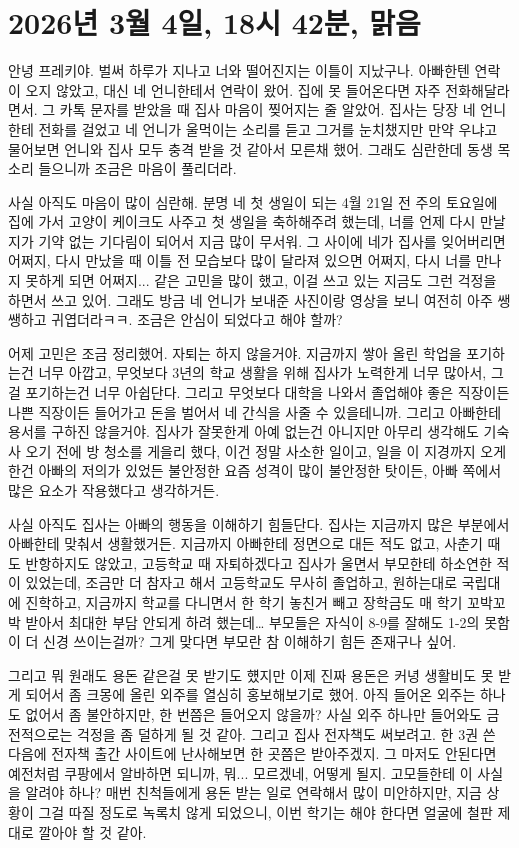 \section{2026년 3월 4일, 18시 42분, 맑음}
안녕 프레키야. 벌써 하루가 지나고 너와 떨어진지는 이틀이 지났구나. 아빠한텐 연락이 오지 않았고, 대신 네 언니한테서 연락이 왔어. 
집에 못 들어온다면 자주 전화해달라면서. 그 카톡 문자를 받았을 때 집사 마음이 찢어지는 줄 알았어. 
집사는 당장 네 언니한테 전화를 걸었고 네 언니가 울먹이는 소리를 듣고 그거를 눈치챘지만 만약 우냐고 물어보면 언니와 집사 모두 충격 받을 것 같아서 모른채 했어. 
그래도 심란한데 동생 목소리 들으니까 조금은 마음이 풀리더라.

사실 아직도 마음이 많이 심란해. 분명 네 첫 생일이 되는 4월 21일 전 주의 토요일에 집에 가서 고양이 케이크도 사주고 첫 생일을 축하해주려 했는데, 
너를 언제 다시 만날지가 기약 없는 기다림이 되어서 지금 많이 무서워. 그 사이에 네가 집사를 잊어버리면 어쩌지, 다시 만났을 때 이틀 전 모습보다 많이 달라져 있으면 어쩌지,
다시 너를 만나지 못하게 되면 어쩌지... 같은 고민을 많이 했고, 이걸 쓰고 있는 지금도 그런 걱정을 하면서 쓰고 있어. 그래도 방금 네 언니가 보내준 사진이랑 영상을 보니 
여전히 아주 쌩쌩하고 귀엽더라ㅋㅋ. 조금은 안심이 되었다고 해야 할까?

어제 고민은 조금 정리했어. 자퇴는 하지 않을거야. 지금까지 쌓아 올린 학업을 포기하는건 너무 아깝고, 무엇보다 3년의 학교 생활을 위해 집사가 노력한게 너무 많아서,
그걸 포기하는건 너무 아쉽단다. 그리고 무엇보다 대학을 나와서 졸업해야 좋은 직장이든 나쁜 직장이든 들어가고 돈을 벌어서 네 간식을 사줄 수 있을테니까. 그리고 아빠한테 
용서를 구하진 않을거야. 집사가 잘못한게 아예 없는건 아니지만 아무리 생각해도 기숙사 오기 전에 방 청소를 게을리 했다, 이건 정말 사소한 일이고, 
일을 이 지경까지 오게 한건 아빠의 저의가 있었든 불안정한 요즘 성격이 많이 불안정한 탓이든, 아빠 쪽에서 많은 요소가 작용했다고 생각하거든. 

사실 아직도 집사는 아빠의 행동을 이해하기 힘들단다. 집사는 지금까지 많은 부분에서 아빠한테 맞춰서 생활했거든. 지금까지 아빠한테 정면으로 대든 적도 없고, 
사춘기 때도 반항하지도 않았고, 고등학교 때 자퇴하겠다고 집사가 울면서 부모한테 하소연한 적이 있었는데, 조금만 더 참자고 해서 고등학교도 무사히 졸업하고, 
원하는대로 국립대에 진학하고, 지금까지 학교를 다니면서 한 학기 놓친거 빼고 장학금도 매 학기 꼬박꼬박 받아서 최대한 부담 안되게 하려 했는데\dots 
부모들은 자식이 8-9를 잘해도 1-2의 못함이 더 신경 쓰이는걸까? 그게 맞다면 부모란 참 이해하기 힘든 존재구나 싶어. 

그리고 뭐 원래도 용돈 같은걸 못 받기도 헀지만 이제 진짜 용돈은 커녕 생활비도 못 받게 되어서 좀 크몽에 올린 외주를 열심히 홍보해보기로 했어. 아직 들어온 
외주는 하나도 없어서 좀 불안하지만, 한 번쯤은 들어오지 않을까? 사실 외주 하나만 들어와도 금전적으로는 걱정을 좀 덜하게 될 것 같아. 그리고 집사 전자책도 써보려고. 
한 3권 쓴 다음에 전자책 출간 사이트에 난사해보면 한 곳쯤은 받아주겠지. 그 마저도 안된다면 예전처럼 쿠팡에서 알바하면 되니까, 뭐... 모르겠네, 어떻게 될지. 고모들한테 
이 사실을 알려야 하나? 매번 친척들에게 용돈 받는 일로 연락해서 많이 미안하지만, 지금 상황이 그걸 따질 정도로 녹록치 않게 되었으니, 이번 학기는 해야 한다면 
얼굴에 철판 제대로 깔아야 할 것 같아.  

